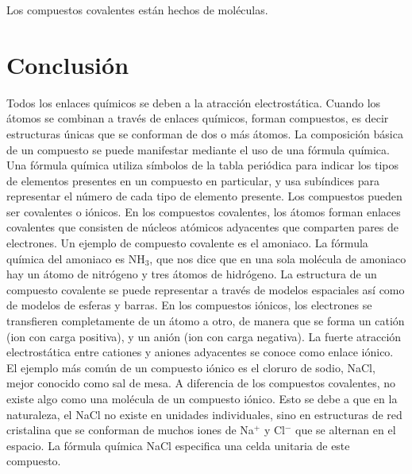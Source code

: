 \documentclass[12pt]{guia}
\begin{document}
\begin{questions}
    \begin{solutionbox}{1.2cm}
        Los compuestos covalentes están hechos de moléculas.
    \end{solutionbox}

    \section{Conclusión}
    Todos los enlaces químicos se deben a la atracción electrostática. Cuando los átomos se combinan a través de enlaces químicos, forman compuestos, es decir estructuras únicas que se conforman de dos o más átomos. La composición básica de un compuesto se puede manifestar mediante el uso de una fórmula química. Una fórmula química utiliza símbolos de la tabla periódica para indicar los tipos de elementos presentes en un compuesto en particular, y usa subíndices para representar el número de cada tipo de elemento presente.
    Los compuestos pueden ser covalentes o iónicos. En los compuestos covalentes, los átomos forman enlaces covalentes que consisten de núcleos atómicos adyacentes que comparten pares de electrones. Un ejemplo de compuesto covalente es el amoniaco. La fórmula química del amoniaco es NH$_3$, que nos dice que en una sola molécula de amoniaco hay un átomo de nitrógeno y tres átomos de hidrógeno. La estructura de un compuesto covalente se puede representar a través de modelos espaciales así como de modelos de esferas y barras.
    En los compuestos iónicos, los electrones se transfieren completamente de un átomo a otro, de manera que se forma un catión (ion con carga positiva), y un anión (ion con carga negativa). La fuerte atracción electrostática entre cationes y aniones adyacentes se conoce como enlace iónico. El ejemplo más común de un compuesto iónico es el cloruro de sodio, NaCl, mejor conocido como sal de mesa. A diferencia de los compuestos covalentes, no existe algo como una molécula de un compuesto iónico. Esto se debe a que en la naturaleza, el NaCl no existe en unidades individuales, sino en estructuras de red cristalina que se conforman de muchos iones de Na$^+$ y Cl$^-$ que se alternan en el espacio. La fórmula química NaCl especifica una celda unitaria de este compuesto.
\end{questions}
\end{document}
